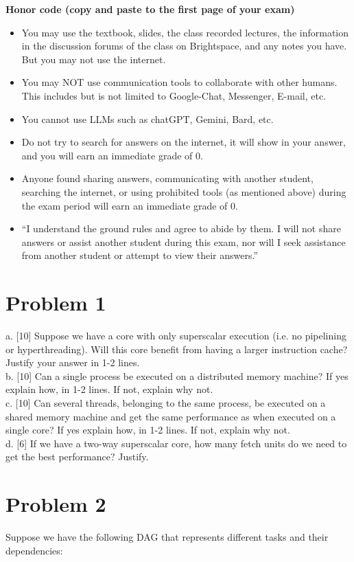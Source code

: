 \documentclass{article}
\begin{document}
\textbf{Honor code (copy and paste to the first page of your exam)}
\begin{itemize}
    \item You may use the textbook, slides, the class recorded lectures, the information in the discussion forums of the class on Brightspace, and any notes you have. But you may not use the internet.
    \item You may NOT use communication tools to collaborate with other humans. This includes but is not limited to Google-Chat, Messenger, E-mail, etc.
    \item You cannot use LLMs such as chatGPT, Gemini, Bard, etc.
    \item Do not try to search for answers on the internet, it will show in your answer, and you will earn an immediate grade of 0.
    \item Anyone found sharing answers, communicating with another student, searching the internet, or using prohibited tools (as mentioned above) during the exam period will earn an immediate grade of 0.
    \item “I understand the ground rules and agree to abide by them. I will not share answers or assist another student during this exam, nor will I seek assistance from another student or attempt to view their answers.”
\end{itemize}

\section*{Problem 1}
a. [10] Suppose we have a core with only superscalar execution (i.e. no pipelining or hyperthreading). Will this core benefit from having a larger instruction cache? Justify your answer in 1-2 lines. \\
b. [10] Can a single process be executed on a distributed memory machine? If yes explain how, in 1-2 lines. If not, explain why not. \\
c. [10] Can several threads, belonging to the same process, be executed on a shared memory machine and get the same performance as when executed on a single core? If yes explain how, in 1-2 lines. If not, explain why not. \\
d. [6] If we have a two-way superscalar core, how many fetch units do we need to get the best performance? Justify.


\section*{Problem 2}
Suppose we have the following DAG that represents different tasks and their dependencies:
\end{document}
